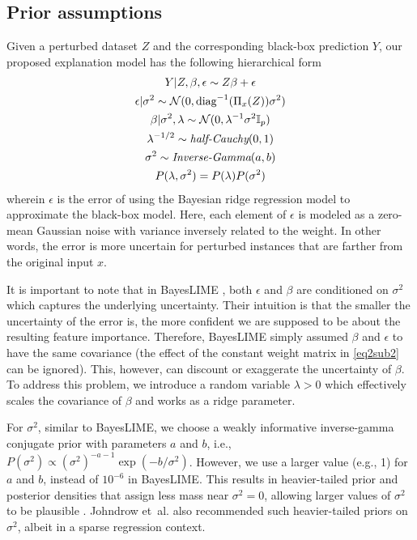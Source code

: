 \documentclass{article}
\theoremstyle{plain}
\theoremstyle{definition}
\theoremstyle{remark}
\begin{document}
\subsection{Prior assumptions} 
Given a perturbed dataset $Z$ and the corresponding black-box prediction $Y$, our proposed explanation model has the following hierarchical form
\begin{subequations}
\begin{gather}
    Y|Z,\beta,\epsilon \sim Z\beta+\epsilon \label{eq2sub1}\\
    \epsilon|\sigma^2 \sim \mathcal{N}(0,\textrm{diag}^{-1}(\Pi_x(Z))\sigma^2) \label{eq2sub2}\\
    \beta|\sigma^2, \lambda \sim \mathcal{N}(0,\lambda^{-1}\sigma^2\mathbb{I}_p) \label{eq2sub3}\\
    \lambda^{-1/2} \sim \textit{\textrm{half-Cauchy}}(0,1) \label{eq2sub4}\\
    \sigma^2 \sim \textit{\textrm{Inverse-Gamma}}(a,b) \label{eq2sub5} \\
    P(\lambda,\sigma^2)=P(\lambda)P(\sigma^2) \nonumber
\end{gather}
\end{subequations}
wherein $\epsilon$ is the error of using the Bayesian ridge regression model to approximate the black-box model. Here, each element of $\epsilon$ is modeled as a zero-mean Gaussian noise with variance inversely related to the weight. In other words, the error is more uncertain for perturbed instances that are farther from the original input $x$. 

It is important to note that in BayesLIME \cite{bayeslime}, both $\epsilon$ and $\beta$ are conditioned on $\sigma^2$ which captures the underlying uncertainty. Their intuition is that the smaller the uncertainty of the error is, the more confident we are supposed to be about the resulting feature importance. Therefore, BayesLIME simply assumed $\beta$ and $\epsilon$ to have the same covariance (the effect of the constant weight matrix in \cref{eq2sub2} can be ignored). This, however, can discount or exaggerate the uncertainty of $\beta$. To address this problem, we introduce a random variable $\lambda>0$ which effectively scales the covariance of $\beta$ and works as a ridge parameter. 

For $\sigma^2$, similar to BayesLIME, we choose a weakly informative inverse-gamma conjugate prior with parameters $a$ and $b$, i.e., $P(\sigma^2)\propto(\sigma^2)^{-a-1}\exp(-b/\sigma^2)$. However, we use a larger value (e.g., 1) for $a$ and $b$, instead of $10^{-6}$ in BayesLIME. This results in heavier-tailed prior and posterior densities that assign less mass near $\sigma^2=0$, allowing larger values of $\sigma^2$ to be plausible \cite{sigmaprior}. Johndrow et~al.  also recommended such heavier-tailed priors on $\sigma^2$, albeit in a sparse regression context. 
\end{document}
